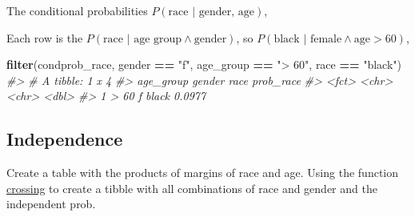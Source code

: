 \documentclass[]{book}
\newenvironment{Shaded}{\begin{snugshade}}{\end{snugshade}}
\newcommand{\KeywordTok}[1]{\textcolor[rgb]{0.13,0.29,0.53}{\textbf{#1}}}
\newcommand{\DataTypeTok}[1]{\textcolor[rgb]{0.13,0.29,0.53}{#1}}
\newcommand{\StringTok}[1]{\textcolor[rgb]{0.31,0.60,0.02}{#1}}
\newcommand{\CommentTok}[1]{\textcolor[rgb]{0.56,0.35,0.01}{\textit{#1}}}
\newcommand{\OperatorTok}[1]{\textcolor[rgb]{0.81,0.36,0.00}{\textbf{#1}}}
\newcommand{\NormalTok}[1]{#1}
\theoremstyle{definition}
\theoremstyle{definition}
\theoremstyle{definition}
\theoremstyle{remark}
\begin{document}
The conditional probabilities \(P(\text{race } | \text{ gender, age})\),

\begin{Shaded}
\end{Shaded}

Each row is the
\(P(\text{race } | \text{ age group} \land \text{gender})\), so
\(P(\text{black } | \text{ female} \land \text{age} > 60)\),

\begin{Shaded}
\begin{Highlighting}[]
\KeywordTok{filter}\NormalTok{(condprob_race, gender }\OperatorTok{==}\StringTok{ "f"}\NormalTok{, age_group }\OperatorTok{==}\StringTok{ "> 60"}\NormalTok{, race }\OperatorTok{==}\StringTok{ "black"}\NormalTok{)}
\CommentTok{#> # A tibble: 1 x 4}
\CommentTok{#>   age_group gender race  prob_race}
\CommentTok{#>   <fct>     <chr>  <chr>     <dbl>}
\CommentTok{#> 1 > 60      f      black    0.0977}
\end{Highlighting}
\end{Shaded}

\subsection{Independence}\label{independence}

Create a table with the products of margins of race and age. Using the
function
\href{https://www.rdocumentation.org/packages/tidyr/topics/crossing}{crossing}
to create a tibble with all combinations of race and gender and the
independent prob.
\end{document}
